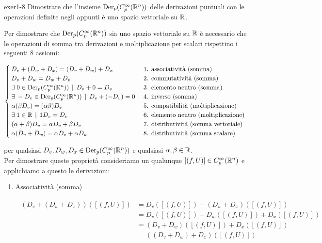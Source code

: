 {exer1-8}
{
Dimostrare che l'insieme $ \operatorname{Der}_{p}(C_{p}^{\infty}(\mathbb{R}^{n})) $ delle derivazioni puntuali con le operazioni definite negli appunti è uno spazio vettoriale su $ \mathbb{R} $.
}
{
Per dimostrare che $ \operatorname{Der}_{p}(C_{p}^{\infty}(\mathbb{R}^{n})) $ sia uno spazio vettoriale su $ \mathbb{R} $ è necessario che le operazioni di somma tra derivazioni e moltiplicazione per scalari rispettino i seguenti 8 assiomi:

\begin{equation}
	\begin{cases}
		D_{v} + (D_{w} + D_{x}) = (D_{v} + D_{w}) + D_{x} & \text{ 1. associatività (somma) } \\
		D_{v} + D_{w} = D_{w} + D_{v} & \text{ 2. commutatività (somma) } \\
		\exists \; 0 \in \operatorname{Der}_{p}(C_{p}^{\infty}(\mathbb{R}^{n})) \, \mid \, D_{v} + 0 = D_{v} & \text{ 3. elemento neutro (somma) } \\
		\exists \; - D_{v} \in \operatorname{Der}_{p}(C_{p}^{\infty}(\mathbb{R}^{n})) \, \mid \, D_{v} + (- D_{v}) = 0 & \text{ 4. inverso (somma) } \\
		\alpha (\beta D_{v}) = (\alpha \beta) D_{v} & \text{ 5. compatibilità (moltiplicazione) } \\
		\exists \; 1 \in \mathbb{R} \, \mid \, 1 D_{v} = D_{v} & \text{ 6. elemento neutro (moltiplicazione) } \\
		(\alpha + \beta) D_{v} = \alpha D_{v} + \beta D_{v} & \text{ 7. distributività (somma vettoriale) } \\
		\alpha (D_{v} + D_{w}) = \alpha D_{v} + \alpha D_{w} & \text{ 8. distributività (somma scalare) }
	\end{cases}
\end{equation}

per qualsiasi $ D_{v}, D_{w}, D_{x} \in \operatorname{Der}_{p}(C_{p}^{\infty}(\mathbb{R}^{n})) $ e qualsiasi $ \alpha, \beta \in \mathbb{R} $. \\
Per dimostrare queste proprietà consideriamo un qualunque $ [(f,U)] \in C_{p}^{\infty}(\mathbb{R}^{n}) $ e applichiamo a questo le derivazioni:

\begin{enumerate}
	\item Associatività (somma)
	
	\begin{align}
		\begin{split}
			( D_{v} + (D_{w} + D_{x}) ) ([(f,U)]) &= D_{v} ([(f,U)]) + (D_{w} + D_{x}) ([(f,U)]) \\
			&= D_{v} ([(f,U)]) + D_{w} ([(f,U)]) + D_{x} ([(f,U)]) \\
			&= (D_{v} + D_{w}) ([(f,U)]) + D_{x} ([(f,U)]) \\
			&= ( (D_{v} + D_{w}) + D_{x} ) ([(f,U)])
		\end{split}
	\end{align}
	

\end{enumerate}}
